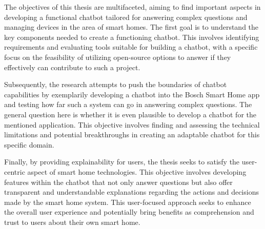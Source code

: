 

The objectives of this thesis are multifaceted, aiming to find important aspects in developing a functional chatbot tailored for answering complex questions and managing devices in the area of smart homes. The first goal is to understand the key components needed to create a functioning chatbot. This involves identifying requirements and evaluating tools suitable for building a chatbot, with a specific focus on the feasibility of utilizing open-source options to answer if they effectively can contribute to such a project.

Subsequently, the research attempts to push the boundaries of chatbot capabilities by exemplarily developing a chatbot into the Bosch Smart Home app and testing how far such a system can go in answering complex questions. The general question here is whether it is even plausible to develop a chatbot for the mentioned application. This objective involves finding and assessing the technical limitations and potential breakthroughs in creating an adaptable chatbot for this specific domain.

Finally, by providing explainability for users, the thesis seeks to satisfy the user-centric aspect of smart home technologies. This objective involves developing features within the chatbot that not only answer questions but also offer transparent and understandable explanations regarding the actions and decisions made by the smart home system. This user-focused approach seeks to enhance the overall user experience and potentially bring benefits as comprehension and trust to users about their own smart home. 

